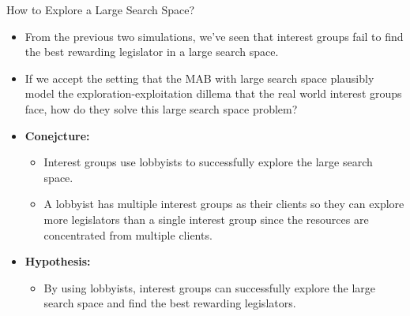 \documentclass{beamer}
\begin{document}
	\begin{frame}{How to Explore a Large Search Space?}
		\begin{itemize}
			\item From the previous two simulations, we've seen that interest groups fail to find the best rewarding legislator in a large search space.
			\item If we accept the setting that the MAB with large search space plausibly model the exploration-exploitation dillema that the real world interest groups face, how do they solve this large search space problem?
			\item \textbf{Conejcture: }
				\begin{itemize}
				\item Interest groups use lobbyists to successfully explore the large search space. 
				\item A lobbyist has multiple interest groups as their clients so they can explore more legislators than a single interest group since the resources are concentrated from multiple clients.
			\end{itemize}
			\item \textbf{Hypothesis: }
			\begin{itemize}
			\item By using lobbyists, interest groups can successfully explore the large search space and find the best rewarding legislators.
			\end{itemize}
	\end{itemize}
	\end{frame}
\end{document}
